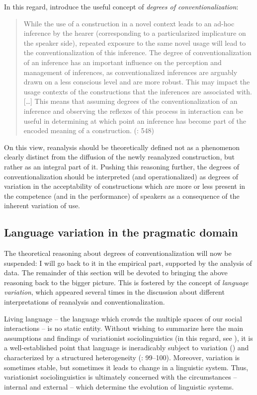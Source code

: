 In this regard, \citet{EhmerRosemeyer2018} introduce the useful concept of \textit{degrees of conventionalization}:

\begin{quote}
While the use of a construction in a novel context leads to an ad-hoc inference by the hearer (corresponding to a particularized implicature on the speaker side), repeated exposure to the same novel usage will lead to the conventionalization of this inference. The degree of conventionalization of an inference has an important influence on the perception and management of inferences, as conventionalized inferences are arguably drawn on a less conscious level and are more robust. This may impact the usage contexts of the constructions that the inferences are associated with. […] This means that assuming degrees of the conventionalization of an inference and observing the reflexes of this process in interaction can be useful in determining at which point an inference has become part of the encoded meaning of a construction. (\citealt{EhmerRosemeyer2018}: 548)
\end{quote}

On this view, reanalysis should be theoretically defined not as a phenomenon clearly distinct from the diffusion of the newly reanalyzed construction, but rather as an integral part of it. Pushing this reasoning further, the degrees of conventionalization should be interpreted (and operationalized) as degrees of variation in the acceptability of constructions which are more or less present in the competence (and in the performance) of speakers as a consequence of the inherent variation of use.

\subsection{Language variation in the pragmatic domain}
\hypertarget{Toc124860638}{}
The theoretical reasoning about degrees of conventionalization will now be suspended: I will go back to it in the empirical part, supported by the analysis of data. The remainder of this section will be devoted to bringing the above reasoning back to the bigger picture. This is fostered by the concept of \textit{language variation}, which appeared several times in the discussion about different interpretations of reanalysis and conventionalization.

Living language – the language which crowds the multiple spaces of our social interactions – is no static entity. Without wishing to summarize here the main assumptions and findings of variationist sociolinguistics (in this regard, see \citealt{Bayley2013}), it is a well-established point that language is ineradicably subject to variation (\citealt{Labov1963,Labov1972}) and characterized by a structured heterogeneity (\citealt{WeinreichEtAl1968}: 99–100). Moreover, variation is sometimes stable, but sometimes it leads to change in a linguistic system. Thus, variationist sociolinguistics is ultimately concerned with the circumstances – internal and external – which determine the evolution of linguistic systems.

